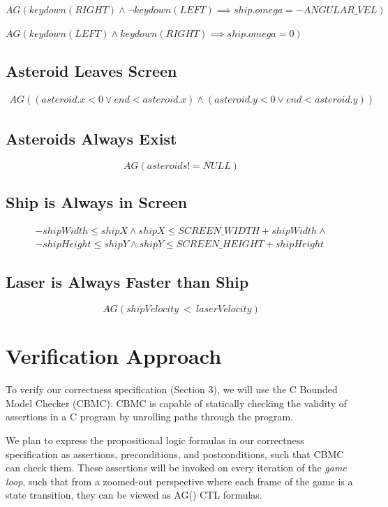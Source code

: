 \documentclass{article}
\begin{document}
        $AG(keydown(RIGHT) \land \lnot keydown(LEFT) \implies ship.omega = -ANGULAR\_VEL)$

        $AG(keydown(LEFT) \land keydown(RIGHT) \implies ship.omega = 0)$

	\subsection{Asteroid Leaves Screen}

		\begin{align*}
			AG((asteroid.x < 0 \lor end < asteroid.x) \land
			(asteroid.y < 0 \lor end < asteroid.y))
		\end{align*}

    \subsection{Asteroids Always Exist}
    \[AG(asteroids != NULL)\]

    \subsection{Ship is Always in Screen}
    \begin{gather*}
        -shipWidth \leq shipX \land shipX \leq SCREEN\_WIDTH + shipWidth \land \\
        -shipHeight \leq shipY \land shipY \leq SCREEN\_HEIGHT + shipHeight
    \end{gather*}

    \subsection{Laser is Always Faster than Ship}
    $$AG(shipVelocity~<~laserVelocity)$$

\section{Verification Approach}

    To verify our correctness specification (Section 3), we will use the C
    Bounded Model Checker (CBMC). CBMC is capable of statically checking the
    validity of assertions in a C program by unrolling paths through the
    program.

    We plan to express the propositional logic formulas in our correctness
    specification as assertions, preconditions, and postconditions, such that
    CBMC can check them. These assertions will be invoked on every iteration of
    the \textit{game loop}, such that from a zoomed-out perspective where each
    frame of the game is a state transition, they can be viewed as AG() CTL
    formulas.
\end{document}

